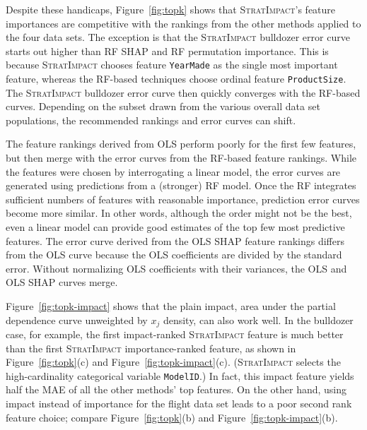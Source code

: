\documentclass[11pt]{article}
\newcommand{\figref}[1]{Figure~\ref{#1}}
\newcommand{\simp}{\fontfamily{cmr}\textsc{\small StratImpact}}
\begin{document}
Despite these handicaps, \figref{fig:topk} shows that \simp{}'s feature importances are competitive with the rankings from the other methods  applied to the four data sets.   The exception is that the \simp{} bulldozer error curve starts out higher than RF SHAP and RF permutation importance. This is because \simp{} chooses feature {\tt YearMade} as the single most important feature, whereas the RF-based techniques choose ordinal feature {\tt ProductSize}. The \simp{} bulldozer error curve then quickly converges with the RF-based curves.  Depending on the subset drawn from the various overall data set populations, the recommended rankings and error curves can shift.

The feature rankings derived from OLS perform poorly for the first few features, but then merge with the error curves from the RF-based feature rankings.  While the features were chosen by interrogating a linear model, the error curves are generated using predictions from a (stronger) RF model. Once the RF integrates sufficient numbers of features with reasonable importance, prediction error curves become more similar.  In other words, although the order might not be the best, even a linear model can provide good estimates of the top few most  predictive features. The error curve derived from the OLS SHAP feature rankings differs from the OLS curve because the OLS coefficients are divided by the standard error. Without normalizing OLS coefficients with their variances, the OLS and OLS SHAP curves merge.

\figref{fig:topk-impact} shows that the plain impact, area under the partial dependence curve unweighted by $x_j$ density, can also work well.  In the bulldozer case, for example, the first impact-ranked \simp{} feature is much better than the first \simp{} importance-ranked feature, as shown in \figref{fig:topk}(c) and \figref{fig:topk-impact}(c). (\simp{} selects the high-cardinality categorical variable {\tt ModelID}.) In fact, this impact feature yields half the MAE of all the other methods' top features. On the other hand, using impact instead of importance for the flight data set leads to a poor second rank feature choice; compare \figref{fig:topk}(b) and \figref{fig:topk-impact}(b).
\end{document}
